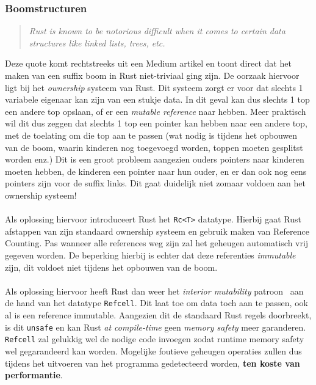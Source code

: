 \subsubsection{Boomstructuren}
\begin{quote}
    \textit{Rust is known to be notorious difficult when it comes to certain data structures like linked lists, trees, etc. \cite{rust_difficulty_quote}}
\end{quote}
Deze quote komt rechtstreeks uit een Medium artikel en toont direct dat het maken van een suffix boom in Rust niet-triviaal ging zijn.
De oorzaak hiervoor ligt bij het \textit{ownership} systeem van Rust.
Dit systeem zorgt er voor dat slechts 1 variabele eigenaar kan zijn van een stukje data.
In dit geval kan dus slechts 1 top een andere top opslaan, of er een \textit{mutable reference} naar hebben.
Meer praktisch wil dit dus zeggen dat slechts 1 top een pointer kan hebben naar een andere top, met de toelating om die top aan te passen (wat nodig is tijdens het opbouwen van de boom, waarin kinderen nog toegevoegd worden, toppen moeten gesplitst worden enz.)
Dit is een groot probleem aangezien ouders pointers naar kinderen moeten hebben, de kinderen een pointer naar hun ouder, en er dan ook nog eens pointers zijn voor de suffix links.
Dit gaat duidelijk niet zomaar voldoen aan het ownership systeem!
\\ \\
Als oplossing hiervoor introduceert Rust het \texttt{Rc<T>} datatype.
Hierbij gaat Rust afstappen van zijn standaard ownership systeem en gebruik maken van Reference Counting.
Pas wanneer alle references weg zijn zal het geheugen automatisch vrij gegeven worden.
De beperking hierbij is echter dat deze referenties \textit{immutable} zijn, dit voldoet niet tijdens het opbouwen van de boom.
\\ \\
Als oplossing hiervoor heeft Rust dan weer het \textit{interior mutability} patroon~\cite{interior_mutability} aan de hand van het datatype \texttt{Refcell}.
Dit laat toe om data toch aan te passen, ook al is een reference immutable.
Aangezien dit de standaard Rust regels doorbreekt, is dit \texttt{unsafe} en kan Rust \textit{at compile-time} geen \textit{memory safety} meer garanderen.
\texttt{Refcell} zal gelukkig wel de nodige code invoegen zodat runtime memory safety wel gegarandeerd kan worden.
Mogelijke foutieve geheugen operaties zullen dus tijdens het uitvoeren van het programma gedetecteerd worden, \textbf{ten koste van performantie}.
\\ \\
